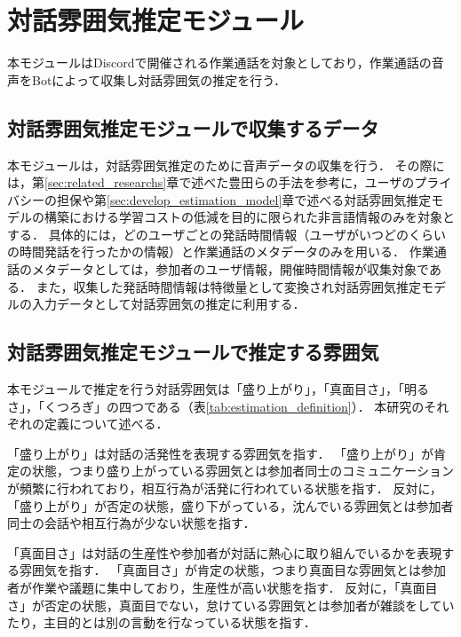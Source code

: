 \section{対話雰囲気推定モジュール\label{node:estimation_module}}

本モジュールはDiscordで開催される作業通話を対象としており，作業通話の音声をBotによって収集し対話雰囲気の推定を行う．

\subsection{対話雰囲気推定モジュールで収集するデータ\label{item:estimation_module_collection_data}}

本モジュールは，対話雰囲気推定のために音声データの収集を行う．
その際には，第\ref{sec:related_researchs}章で述べた豊田らの手法を参考に，ユーザのプライバシーの担保や第\ref{sec:develop_estimation_model}章で述べる対話雰囲気推定モデルの構築における学習コストの低減を目的に限られた非言語情報のみを対象とする．
具体的には，どのユーザごとの発話時間情報（ユーザがいつどのくらいの時間発話を行ったかの情報）と作業通話のメタデータのみを用いる．
作業通話のメタデータとしては，参加者のユーザ情報，開催時間情報が収集対象である．
また，収集した発話時間情報は特徴量として変換され対話雰囲気推定モデルの入力データとして対話雰囲気の推定に利用する．

\subsection{対話雰囲気推定モジュールで推定する雰囲気\label{item:estimated_atmosphere}}

本モジュールで推定を行う対話雰囲気は「盛り上がり」，「真面目さ」，「明るさ」，「くつろぎ」の四つである（表\ref{tab:estimation_definition}）．
本研究のそれぞれの定義について述べる．

「盛り上がり」は対話の活発性を表現する雰囲気を指す．
「盛り上がり」が肯定の状態，つまり盛り上がっている雰囲気とは参加者同士のコミュニケーションが頻繁に行われており，相互行為が活発に行われている状態を指す．
反対に，「盛り上がり」が否定の状態，盛り下がっている，沈んでいる雰囲気とは参加者同士の会話や相互行為が少ない状態を指す．

「真面目さ」は対話の生産性や参加者が対話に熱心に取り組んでいるかを表現する雰囲気を指す．
「真面目さ」が肯定の状態，つまり真面目な雰囲気とは参加者が作業や議題に集中しており，生産性が高い状態を指す．
反対に，「真面目さ」が否定の状態，真面目でない，怠けている雰囲気とは参加者が雑談をしていたり，主目的とは別の言動を行なっている状態を指す．

